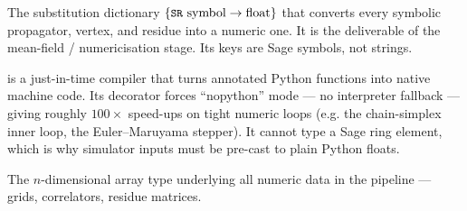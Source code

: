\begin{description}[leftmargin=0pt,style=nextline]
  \item[\code{num\_params}] The substitution dictionary
        $\{\code{SR}\ \text{symbol}\to\text{float}\}$ that converts every symbolic
        propagator, vertex, and residue into a numeric one. It is the deliverable of
        the mean-field / numericisation stage. Its keys are Sage  symbols,
        not strings.

  \item[\code{numba} / \code{@njit} / nopython mode]  is a
        just-in-time compiler that turns annotated Python functions into native
        machine code. Its  decorator forces ``nopython'' mode --- no
        interpreter fallback --- giving roughly $100\times$ speed-ups on tight
        numeric loops (e.g. the chain-simplex inner loop, the Euler--Maruyama
        stepper). It cannot type a Sage ring element, which is why simulator inputs
        must be pre-cast to plain Python floats.

  \item[NumPy \code{ndarray}] The $n$-dimensional array type underlying all numeric
        data in the pipeline --- grids, correlators, residue matrices.

\end{description}

